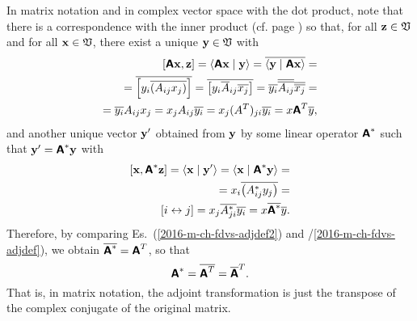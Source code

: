 In matrix notation and in complex vector space with the dot product,
note that there is a correspondence with the inner product
(cf. page \pageref{2011-m-corr-bil-ip})
so that, for all ${\bf z}\in {\frak V}$ and for all ${\bf x}\in {\frak V}$,
there exist a unique ${\bf y}\in {\frak V}$ with
\begin{equation}
\begin{split}
[\textsf{\textbf{A}}{\bf x}, {\bf z}]
=\langle \textsf{\textbf{A}} {\bf x}\mid {\bf y}\rangle
=\overline{ \langle{\bf y}\mid \textsf{\textbf{A}} {\bf x}\rangle }
= \\
= \overline{ \left[y_i   \overline{ \left( A_{ij}  x_j  \right) }  \right]}
= \overline{ \left[y_i    \overline{ A}_{ij} \overline{ x_j}     \right]}
= \overline{ y_i }    \overline{\overline{ A_{ij} }}  \overline{ \overline{ x_j } }
= \\
= \overline{y_i} A_{ij}  x_j
= x_j A_{ij}  \overline{y_i}
= x_j (A^T)_{ji}  \overline{y_i}
= x  \textsf{\textbf{A}}^T \overline{ y },
\end{split}
\label{2016-m-ch-fdvs-adjdef}
\end{equation}
and another unique vector ${\bf y}'$ obtained from ${\bf y}$ by
some linear operator $\textsf{\textbf{A}}^\ast$
such that ${\bf y}'=\textsf{\textbf{A}}^\ast {\bf y}$ with
\begin{equation}
\begin{split}
[{\bf x}, \textsf{\textbf{A}}^\ast {\bf z}]
= \langle {\bf x}\mid {\bf y}'\rangle
= \langle {\bf x}\mid \textsf{\textbf{A}}^\ast {\bf y}\rangle
=\\
= x_i \overline{ \left(A_{ij}^\ast y_j \right) }
=\\
[ i \leftrightarrow j]
= x_j \overline{  A_{ji}^\ast} \overline{  y_i  }
=    x \overline{\textsf{\textbf{A}}^\ast} \overline{y}.
\end{split}
\label{2016-m-ch-fdvs-adjdef2}
\end{equation}
Therefore, by comparing Es.~(\ref{2016-m-ch-fdvs-adjdef2}) and /\ref{2016-m-ch-fdvs-adjdef}),  we obtain $\overline{ \textsf{\textbf{A}}^\ast}=\textsf{\textbf{A}}^T$, so that
\begin{equation}
\textsf{\textbf{A}}^\ast =\overline{\textsf{\textbf{A}}^T} = \overline{\textsf{\textbf{A}}}^T.
\end{equation}
That is, in matrix notation, the adjoint transformation is just the
transpose of the complex conjugate of the original matrix.

